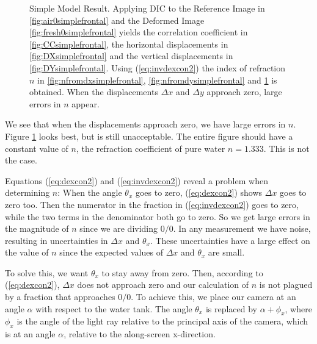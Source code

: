 \documentclass{svjour3}                     %
\begin{document}
\begin{figure}[htbp]
\begin{subfigure}{.45\linewidth}
	\label{fig:nfrontal}
\end{subfigure}
\caption{Simple Model Result. Applying DIC to the Reference Image in \ref{fig:air0simplefrontal} and the Deformed Image \ref{fig:fresh0simplefrontal} yields the correlation coefficient in \ref{fig:CCsimplefrontal}, the horizontal displacements in \ref{fig:DXsimplefrontal} and the vertical displacements in \ref{fig:DYsimplefrontal}. Using (\ref{eq:invdexcon2}) the index of refraction $n$ in \ref{fig:nfromdxsimplefrontal}, \ref{fig:nfromdysimplefrontal} and \ref{fig:nfrontal} is obtained. When the displacements $\Delta x$ and $\Delta y$ approach zero, large errors in $n$ appear. }
\label{fig:simmod}
\end{figure} %

We see that when the displacements approach zero, we have large errors in $n$. Figure \ref{fig:nfrontal} looks best, but is still unacceptable. The entire figure should have a constant value of $n$, the refraction coefficient of pure water $n= 1.333$. This is not the case.
 
Equations (\ref{eq:dexcon2}) and (\ref{eq:invdexcon2}) reveal a problem when determining $n$: When the angle $\theta_x$ goes to zero, (\ref{eq:dexcon2}) shows $\Delta x$ goes to zero too. Then the numerator in the fraction in (\ref{eq:invdexcon2}) goes to zero, while the two terms in the denominator both go to zero. So we get large errors in the magnitude of $n$ since we are dividing $0/0$. In any measurement we have noise, resulting in uncertainties in $\Delta x$ and $\theta_x$. These uncertainties have a large effect on the value of $n$ since the expected values of $\Delta x$ and $\theta_x$ are small. %

To solve this, we want $\theta_x$ to stay away from zero. Then, according to (\ref{eq:dexcon2}), $\Delta x$ does not approach zero and our calculation of $n$ is not plagued by a fraction that approaches $0/0$. To achieve this, we place our camera at an angle $\alpha$ with respect to the water tank. The angle $\theta_x$ is replaced by $\alpha+\phi_x$, where $\phi_x$ is the angle of the light ray relative to the principal axis of the camera, which is at an angle $\alpha$,  relative to the along-screen x-direction.  %
\end{document}
